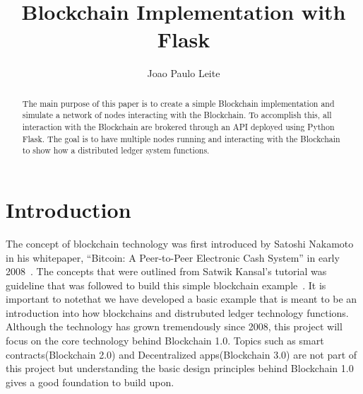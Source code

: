 
\title{Blockchain Implementation with Flask}


\author{Joao Paulo Leite}

\renewcommand{\shortauthors}{J. P. Leite}


\begin{abstract}
  The main purpose of this paper is to create a simple Blockchain
  implementation and simulate a network of nodes interacting with the
  Blockchain. To accomplish this, all interaction with the Blockchain
  are brokered through an API deployed using Python Flask. The goal is
  to have multiple nodes running and interacting with the Blockchain
  to show how a distributed ledger system functions.

\end{abstract}



\maketitle

\section{Introduction}

The concept of blockchain technology was first introduced by Satoshi
Nakamoto in his whitepaper, ``Bitcoin: A Peer-to-Peer Electronic Cash
System'' in early
2008~\cite{hid-sp18-414-www-blockchain-theory-application}.  The
concepts that were outlined from Satwik Kansal's tutorial was guideline that
was followed to build this simple blockchain example~\cite{hid-sp18-414-www-blockchain-example}. 
It is important to notethat we have developed a basic example that is meant to be an
introduction into how blockchains and distrubuted ledger technology
functions. Although the technology has grown tremendously since 2008,
this project will focus on the core technology behind Blockchain
1.0. Topics such as smart contracts(Blockchain 2.0) and Decentralized
apps(Blockchain 3.0) are not part of this project but understanding
the basic design principles behind Blockchain 1.0 gives a good
foundation to build upon.

